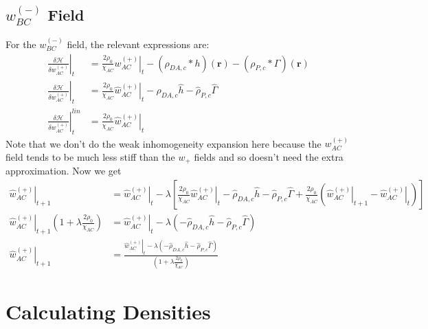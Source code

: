 \documentclass{article}
\begin{document}
\subsection{$w_{BC}^{(-)}$ Field}

For the $w_{BC}^{(-)}$ field, the relevant expressions are:
\begin{align*}
  \left. \frac{\delta \mathcal{H}}{\delta w_{AC}^{(+)}} \right|_t &=
    \frac{2 \rho_0}{\chi_{AC}} \left. w_{AC}^{(+)} \right|_t
    - (\rho_{DA,c} \ast h)(\mathbf{r})
    - (\rho_{P,c} \ast \Gamma)(\mathbf{r}) \\
  \left. \hat{\frac{\delta \mathcal{H}}{\delta w_{AC}^{(+)}}} \right|_t &=
    \frac{2 \rho_0}{\chi_{AC}} \left. \hat{w}_{AC}^{(+)} \right|_t
    - \hat{\rho}_{DA,c} \hat{h}
    - \hat{\rho}_{P,c}  \hat{\Gamma} \\
  \left.
    \hat{\frac{\delta \mathcal{H}}{\delta w_{AC}^{(+)}}}
  \right| ^{lin}_t &=
    \frac{2\rho_0}{\chi_{AC}} \left. \hat{w}_{AC}^{(+)} \right|_t
\end{align*}
Note that we don't do the weak inhomogeneity expansion here because the
  $w_{AC}^{(+)}$ field tends to be much less stiff than the $w_+$ fields and so
  doesn't need the extra approximation.
Now we get
\begin{align*}
  \left. \hat{w}_{AC}^{(+)} \right|_{t+1} &=
    \left. \hat{w}_{AC}^{(+)} \right|_t - \lambda \left[
      \frac{2\rho_0}{\chi_{AC}} \left. \hat{w}_{AC}^{(+)} \right|_t
      - \hat{\rho}_{DA,c} \hat{h}
      - \hat{\rho}_{P,c}  \hat{\Gamma}
      + \frac{2\rho_0}{\chi_{AC}}
        ( \left. \hat{w}_{AC}^{(+)}\right|_{t+1}
          - \left. \hat{w}_{AC}^{(+)} \right|_t
        )
    \right] \\
  \left. \hat{w}_{AC}^{(+)} \right|_{t+1} ( 1 + \lambda \frac{2
    \rho_0}{\chi_{AC}} ) &=
    \left. \hat{w}_{AC}^{(+)} \right|_t - \lambda \left(
      - \hat{\rho}_{DA,c} \hat{h}
      - \hat{\rho}_{P,c}  \hat{\Gamma}
    \right) \\
  \left. \hat{w}_{AC}^{(+)} \right|_{t+1} &=
    \frac{
      \left. \hat{w}_{AC}^{(+)} \right|_t - \lambda \left(
        - \hat{\rho}_{DA,c} \hat{h}
        - \hat{\rho}_{P,c}  \hat{\Gamma}
      \right)
    }
    {
      \left( 1 + \lambda \frac{2 \rho_0}{\chi_{AC}} \right)
    }
\end{align*}

\section{Calculating Densities}
\end{document}
